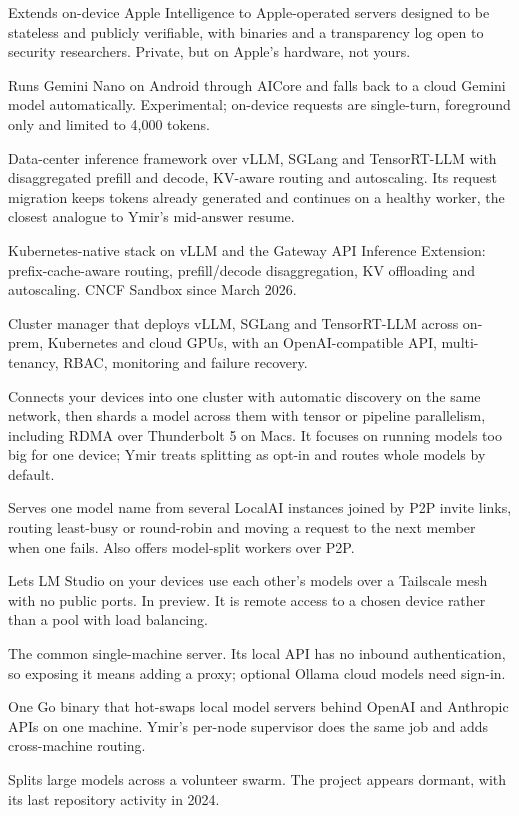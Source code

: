 \begin{rowlist}
  \item[Apple Private Cloud Compute] Extends on-device Apple Intelligence to Apple-operated servers designed to be stateless and publicly verifiable, with binaries and a transparency log open to security researchers. Private, but on Apple's hardware, not yours.
  \item[Google Gemini Nano with Firebase AI Logic] Runs Gemini Nano on Android through AICore and falls back to a cloud Gemini model automatically. Experimental; on-device requests are single-turn, foreground only and limited to 4,000 tokens.
  \item[NVIDIA Dynamo] Data-center inference framework over vLLM, SGLang and TensorRT-LLM with disaggregated prefill and decode, KV-aware routing and autoscaling. Its request migration keeps tokens already generated and continues on a healthy worker, the closest analogue to Ymir's mid-answer resume.
  \item[llm-d] Kubernetes-native stack on vLLM and the Gateway API Inference Extension: prefix-cache-aware routing, prefill/decode disaggregation, KV offloading and autoscaling. CNCF Sandbox since March 2026.
  \item[GPUStack] Cluster manager that deploys vLLM, SGLang and TensorRT-LLM across on-prem, Kubernetes and cloud GPUs, with an OpenAI-compatible API, multi-tenancy, RBAC, monitoring and failure recovery.
  \item[exo] Connects your devices into one cluster with automatic discovery on the same network, then shards a model across them with tensor or pipeline parallelism, including RDMA over Thunderbolt 5 on Macs. It focuses on running models too big for one device; Ymir treats splitting as opt-in and routes whole models by default.
  \item[LocalAI federation] Serves one model name from several LocalAI instances joined by P2P invite links, routing least-busy or round-robin and moving a request to the next member when one fails. Also offers model-split workers over P2P.
  \item[LM Studio LM Link] Lets LM Studio on your devices use each other's models over a Tailscale mesh with no public ports. In preview. It is remote access to a chosen device rather than a pool with load balancing.
  \item[Ollama] The common single-machine server. Its local API has no inbound authentication, so exposing it means adding a proxy; optional Ollama cloud models need sign-in.
  \item[llama-swap] One Go binary that hot-swaps local model servers behind OpenAI and Anthropic APIs on one machine. Ymir's per-node supervisor does the same job and adds cross-machine routing.
  \item[Petals] Splits large models across a volunteer swarm. The project appears dormant, with its last repository activity in 2024.
\end{rowlist}

